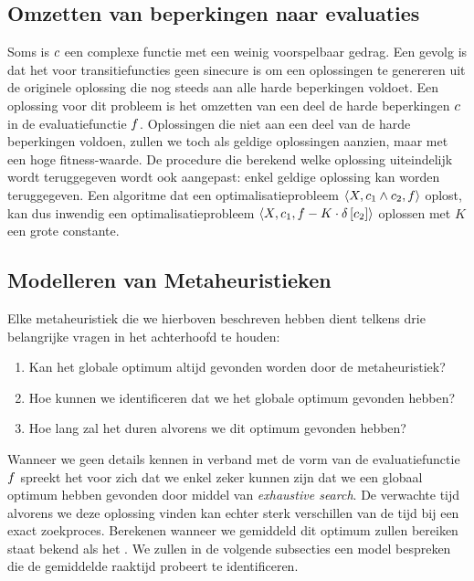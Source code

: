 \subsection{Omzetten van beperkingen naar evaluaties}

Soms is $c$ een complexe functie met een weinig voorspelbaar gedrag. Een gevolg is dat het voor transitiefuncties geen sinecure is om een oplossingen te genereren uit de originele oplossing die nog steeds aan alle harde beperkingen voldoet. Een oplossing voor dit probleem is het omzetten van een deel de harde beperkingen $c$ in de evaluatiefunctie $f$. Oplossingen die niet aan een deel van de harde beperkingen voldoen, zullen we toch als geldige oplossingen aanzien, maar met een hoge fitness-waarde. De procedure die berekend welke oplossing uiteindelijk wordt teruggegeven wordt ook aangepast: enkel geldige oplossing kan worden teruggegeven. Een algoritme dat een optimalisatieprobleem $\left\langle X,c_1\wedge c_2,f\right\rangle$ oplost, kan dus inwendig een optimalisatieprobleem $\left\langle X,c_1,f-K\cdot\delta\left[c_2\right]\right\rangle$ oplossen met $K$ een grote constante.\cite{dmathematicsforbioinformatics}

\subsection{Modelleren van Metaheuristieken}

Elke metaheuristiek die we hierboven beschreven hebben dient telkens drie belangrijke vragen in het achterhoofd te houden\cite{DBLP:journals/jc/ShonkwilerV94}:
\begin{enumerate}
 \item Kan het globale optimum altijd gevonden worden door de metaheuristiek?
 \item Hoe kunnen we identificeren dat we het globale optimum gevonden hebben?
 \item Hoe lang zal het duren alvorens we dit optimum gevonden hebben?
\end{enumerate}

Wanneer we geen details kennen in verband met de vorm van de evaluatiefunctie $f$ spreekt het voor zich dat we enkel zeker kunnen zijn dat we een globaal optimum hebben gevonden door middel van \emph{exhaustive search}. De verwachte tijd alvorens we deze oplossing vinden kan echter sterk verschillen van de tijd bij een exact zoekproces. Berekenen wanneer we gemiddeld dit optimum zullen bereiken staat bekend als het \cite{DBLP:journals/jc/ShonkwilerV94}. We zullen in de volgende subsecties een model bespreken die de gemiddelde raaktijd probeert te identificeren.

